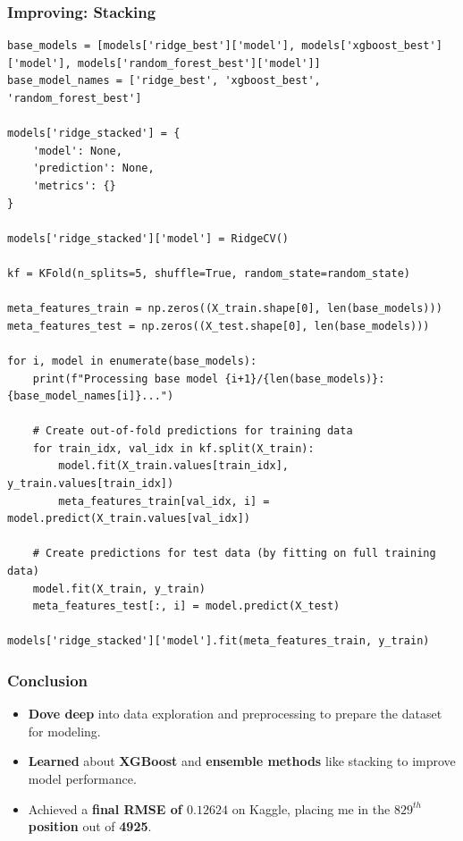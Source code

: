 \documentclass{beamer}
\begin{document}
\begin{frame}[fragile]
\frametitle{Improving: Stacking}

\begin{verbatim}
base_models = [models['ridge_best']['model'], models['xgboost_best']['model'], models['random_forest_best']['model']]
base_model_names = ['ridge_best', 'xgboost_best', 'random_forest_best']

models['ridge_stacked'] = {
    'model': None,
    'prediction': None,
    'metrics': {}
}

models['ridge_stacked']['model'] = RidgeCV()

kf = KFold(n_splits=5, shuffle=True, random_state=random_state)

meta_features_train = np.zeros((X_train.shape[0], len(base_models)))
meta_features_test = np.zeros((X_test.shape[0], len(base_models)))

for i, model in enumerate(base_models):
    print(f"Processing base model {i+1}/{len(base_models)}: {base_model_names[i]}...")

    # Create out-of-fold predictions for training data
    for train_idx, val_idx in kf.split(X_train):
        model.fit(X_train.values[train_idx], y_train.values[train_idx])
        meta_features_train[val_idx, i] = model.predict(X_train.values[val_idx])

    # Create predictions for test data (by fitting on full training data)
    model.fit(X_train, y_train)
    meta_features_test[:, i] = model.predict(X_test)

models['ridge_stacked']['model'].fit(meta_features_train, y_train)
\end{verbatim}
\end{frame}

\begin{frame}
\frametitle{Conclusion}

\begin{itemize}
    \item \textbf{Dove deep} into data exploration and preprocessing to prepare the dataset for modeling.
    \item \textbf{Learned} about \textbf{XGBoost} and \textbf{ensemble methods} like stacking to improve model performance.
    \item Achieved a \textbf{final RMSE of $0.12624$} on Kaggle, placing me in the \textbf{$829^{th}$ position} out of \textbf{4925}.
\end{itemize}
\end{frame}
\end{document}
